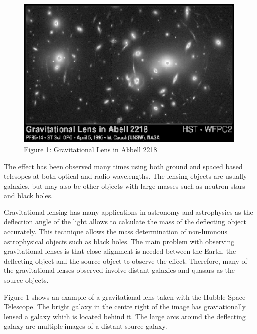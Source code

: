 \documentclass[a4paper]{IEEEtran}
\begin{document}
\begin{figure}[h] 
    \caption{Figure 1: Gravitational Lens in Abbell 2218} 
    \label{fig:abbell} 
    \begin{center}
        \includegraphics[width=\columnwidth]{images/hubble.eps}
    \end{center}
\end{figure}

The effect has been observed many times using both ground and spaced
based telesopes at both optical and radio wavelengths. The lensing objects
are usually galaxies, but may also be other objects with large masses
such as neutron stars and black holes. 

Gravitational lensing has many applications in astronomy and astrophysics
as the deflection angle of the light allows to calculate the mass
of the deflecting object accurately. This technique allows the mass determination
of non-lumnous astrophysical objects such as black holes.
The main problem with observing gravitational lenses is that close
alignment is needed between the Earth, the deflecting object and 
the source object to observe the effect. Therefore, many of the gravitational
lenses observed involve distant galaxies and quasars as the source objects.

Figure 1 shows an example of a gravitational lens taken with the 
Hubble Space Telescope. The bright galaxy in the centre right of the image
has graviationally lensed a galaxy which is located behind it. 
The large arcs around the deflecting galaxy are multiple images of 
a distant source galaxy.
\end{document}
